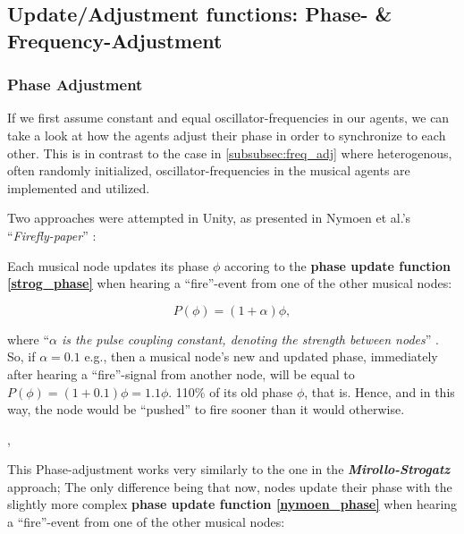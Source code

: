 	
	\subsection{Update/Adjustment functions: Phase- \& Frequency-Adjustment}
	\label{subsec:update_functions}
		\subsubsection{Phase Adjustment}
		\label{subsubsec:phase_adj}
			If we first assume constant and equal oscillator-frequencies in our agents, we can take a look at how the agents adjust their phase in order to synchronize to each other. This is in contrast to the case in \ref{subsubsec:freq_adj} where heterogenous, often randomly initialized, oscillator-frequencies in the musical agents are implemented and utilized.
			
			Two approaches were attempted in Unity, as presented in Nymoen et al.'s ``\textit{Firefly-paper}'' \cite{nymoen_synch}:
			
			
			Each musical node updates its phase $\phi$ accoring to the \textbf{phase update function \eqref{strog_phase}} when hearing a ``fire''-event from one of the other musical nodes:
			
			\begin{equation}\label{strog_phase}
			P(\phi) = (1 + \alpha)\phi	,
			\end{equation}
			
			where ``\textit{$\alpha$ is the pulse coupling constant, denoting the strength between nodes}'' \cite{nymoen_synch}. So, if $\alpha = 0.1$ e.g., then a musical node's new and updated phase, immediately after hearing a ``fire''-signal from another node, will be equal to $P(\phi) = (1 + 0.1)\phi = 1.1\phi$. 110\% of its old phase $\phi$, that is. Hence, and in this way, the node would be ``pushed'' to fire sooner than it would otherwise.
			
			\sep
			
			
			
			
			This Phase-adjustment works very similarly to the one in the \textbf{\textit{Mirollo-Strogatz}} approach; The only difference being that now, nodes update their phase with the slightly more complex \textbf{phase update function \eqref{nymoen_phase}} when hearing a ``fire''-event from one of the other musical nodes:
			
